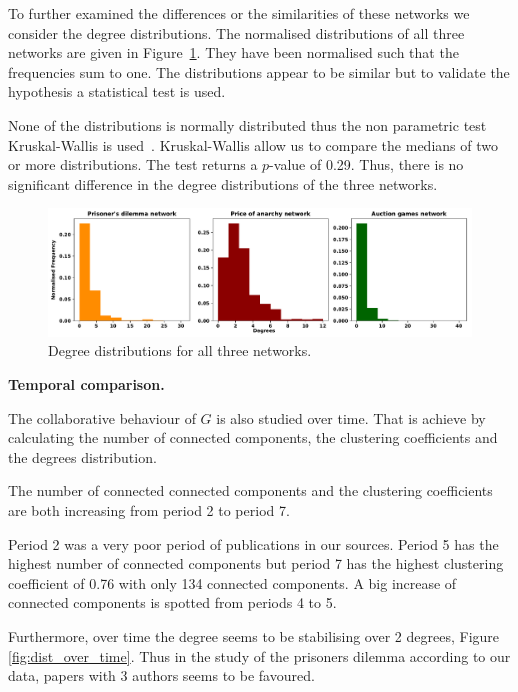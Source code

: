 \documentclass{article}
\begin{document}
To further examined the differences or the similarities of these networks we
consider the degree distributions. The normalised distributions of all
three networks are given in Figure~\ref{fig:degrees_dist}. They have been normalised
such that the frequencies sum to one. The distributions appear to be similar
but to validate the hypothesis a statistical test is used.

None of the distributions is normally distributed thus the non parametric test
Kruskal-Wallis is used~\cite{mckight2010}. Kruskal-Wallis allow us to compare the
medians of two or more distributions. The test returns a \(p\)-value of 0.29.
Thus, there is no significant difference in the degree distributions of the
three networks.

\begin{figure}[!hbtp]
    \centering
    \includegraphics[width=\textwidth]{./assets/images/degrees_histrograms.pdf}
    \caption{Degree distributions for all three networks.}\label{fig:degrees_dist}
\end{figure}

\textbf{Temporal comparison.}

The collaborative behaviour of \(G\) is also studied over time. That is achieve
by calculating the number of connected components, the clustering coefficients and
the degrees distribution.

The number of connected connected components and the clustering coefficients 
are both increasing from period 2 to period 7.

Period 2 was a very poor period of publications in our sources.
Period 5 has the highest number of connected components but period 7 has the highest
clustering coefficient of 0.76 with only 134 connected components.
A big increase of connected components is spotted from periods 4 to 5.

Furthermore, over time the degree seems to be stabilising over 2 degrees, Figure
\ref{fig:dist_over_time}. Thus in the  study of the prisoners dilemma according
to our data, papers with 3 authors seems to be favoured.
\end{document}
